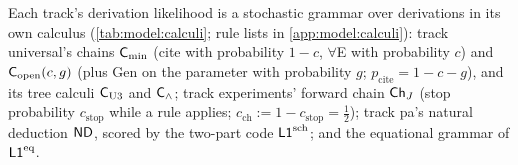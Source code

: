 \begin{definition}\label{def:model:calculi}
Each track's derivation likelihood is a stochastic grammar over derivations in its own calculus (\cref{tab:model:calculi}; rule lists in \cref{app:model:calculi}): track universal's chains $\mathsf{C}_{\min}$ (cite with probability $1-c$, $\forall$E with probability $c$) and $\mathsf{C}_{\mathrm{open}}(c,g)$ (plus Gen on the parameter with probability $g$; $p_{\mathrm{cite}}=1-c-g$), and its tree calculi $\mathsf{C}_{\mathrm{U3}}$ and $\mathsf{C}_{\wedge}$; track experiments' forward chain $\mathsf{Ch}_{J}$ (stop probability $c_{\mathrm{stop}}$ while a rule applies; $c_{\mathrm{ch}}:=1-c_{\mathrm{stop}}=\tfrac12$); track pa's natural deduction $\mathsf{ND}$, scored by the two-part code $\mathord{\mathsf{L1}}^{\mathrm{sch}}$; and the equational grammar of $\mathord{\mathsf{L1}}^{\mathrm{eq}}$.
\end{definition}

